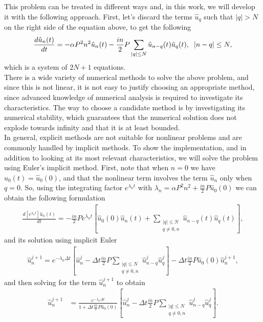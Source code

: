 		This problem can be treated in different ways and, in this work, we will develop it with the following approach. First, let's discard the terms $\hat{u}_q$ such that $|q| > N$ on the right side of the equation above, to get the following
		\begin{align*}
			\frac{d \hat{u}_n (t)}{dt} =  -\alpha P^2 n^2 \hat{u}_n (t) - \frac{in}{2} P \sum_{|q| \leq N} \hat{u}_{n - q} (t) \hat{u}_q (t), \hspace{2mm} |n - q| \leq N , 
		\end{align*}
		which is a system of $2N + 1$ equations. \\
		
		There is a wide variety of numerical methods to solve the above problem, and since this is not linear, it is not easy to justify choosing an appropriate method, since advanced knowledge of numerical analysis is required to investigate its characteristics. The way to choose a candidate method is by investigating its numerical stability, which guarantees that the numerical solution does not explode towards infinity and that it is at least bounded. \\
		
		In general, explicit methods are not suitable for nonlinear problems and are commonly handled by implicit methods. To show the implementation, and in addition to looking at its most relevant characteristics, we will solve the problem using Euler's implicit method. First, note that when $n = 0$ we have $\hat{u}_0 (t) = \hat{u}_0 (0)$, and that the nonlinear term involves the term $\hat{u}_n$ only when $q = 0$. So, using the integrating factor $e^{\lambda_n t}$ with $\lambda_n = \alpha P^2 n^2 + \frac{in}{2} P \hat{u}_0 (0) $ we can obtain the following formulation
		\begin{align*}
			\frac{d \left[ e^{\lambda_n t} \right]  \hat{u}_n (t)}{dt} = - \frac{in}{2} P e^{ \lambda_n t} \left[ \hat{u}_0 (0) \hat{u}_n (t) + \sum_{\substack{|q|\leq N \\ q \neq 0, n}} \hat{u}_{n - q} (t) \hat{u}_q (t) \right],
		\end{align*}	
		and its solution using implicit Euler
		\begin{align*}
			\hat{u}^{j+1}_n = e^{- \lambda_n \Delta t} \left[ \hat{u}^j_n - \Delta t \frac{in}{2} P \sum_{\substack{|q|\leq N \\ q \neq 0, n}} \hat{u}^{j}_{n - q} \hat{u}^{j}_q \right] - \Delta t \frac{in}{2} P \hat{u}_0 (0) \hat{u}^{j+1}_n, 
		\end{align*}
		and then solving for the term $\hat{u}^{j + 1}_n$ to obtain
		\begin{align*}
			\hat{u}^{j+1}_n &= \frac{ e^{- \lambda_n \Delta t}}{ 1 + \Delta t \frac{in}{2} P \hat{u}_0 (0) } \left[ \hat{u}^j_n - \Delta t \frac{in}{2} P \sum_{\substack{|q|\leq N \\ q \neq 0, n}} \hat{u}^{j}_{n - q} \hat{u}^{j}_q \right].   
		\end{align*}	
		
